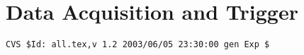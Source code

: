 \chapter{Data Acquisition and Trigger}
\graphicspath{{daq_trig/figs/}}
\renewcommand{\dirfig}[0]{daq_trig/figs}
\renewcommand{\dircur}[0]{daq_trig}





%
%
{\small
\begin{verbatim}CVS $Id: all.tex,v 1.2 2003/06/05 23:30:00 gen Exp $\end{verbatim}
}
